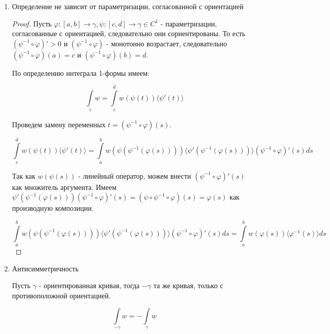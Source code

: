 \documentclass[a5paper]{article}
\theoremstyle{plain}
\theoremstyle{definition}
\numberwithin{through}{section}
\numberwithin{equation}{section}
\begin{document}
\begin{enumerate}
	\item Определение не зависит от параметризации, согласованной с ориентацией
	
	\begin{proof}
		Пусть $\varphi : [a, b] \to \gamma, \psi : [c, d] \to \gamma \in C^1$ - параметризации, согласованные с ориентацией, следовательно они сориентированы. То есть  $(\psi^{-1} \circ \varphi)' > 0$ и $(\psi^{-1} \circ \varphi)$ - монотонно возрастает, следовательно $(\psi^{-1} \circ \varphi)(a) = c$ и $(\psi^{-1} \circ \varphi)(b) = d$.
		
		По определению интеграла 1-формы имеем:
		
		\begin{equation*}
			\int\limits_{\gamma} w = \int\limits_{c}^{d} w(\psi(t)) \langle \psi'(t) \rangle 
		\end{equation*}
		
		Проведем замену переменных $t = (\psi^{-1} \circ \varphi)(s)$.
		
		\begin{equation*}
			\int\limits_{c}^{d} w(\psi(t)) \langle \psi'(t) \rangle = \int\limits_{a}^{b} w(\psi(\psi^{-1}(\varphi(s)))) \langle \psi'(\psi^{-1}(\varphi(s))) \rangle (\psi^{-1} \circ \varphi)'(s) ds
		\end{equation*}
		
		Так как $w(\psi(s))$ - линейный оператор, можем внести $(\psi^{-1} \circ \varphi)'(s)$ как множитель аргумента. Имеем $\psi'(\psi^{-1}(\varphi(s)))(\psi^{-1} \circ \varphi)'(s) = (\psi \circ \psi^{-1} \circ \varphi)(s)= \varphi(s)$ как производную композиции.
		
		\begin{equation*}
			 \int\limits_{a}^{b} w(\psi(\psi^{-1}(\varphi(s)))) \langle \psi'(\psi^{-1}(\varphi(s))) \rangle (\psi^{-1} \circ \varphi)'(s) ds = \int\limits_{a}^{b} w(\varphi(s)) \langle \varphi^{-1}(s) \rangle ds
		\end{equation*} 
	\end{proof}

	\item Антисимметричность
	
	Пусть $\gamma$ - ориентированная кривая, тогда $-\gamma$ та же кривая, только с противоположной ориентацией. 
	
	\begin{equation*}
		\int\limits_{-\gamma} w = -\int\limits_{\gamma} w
	\end{equation*}
	

\end{enumerate}
\end{document}
